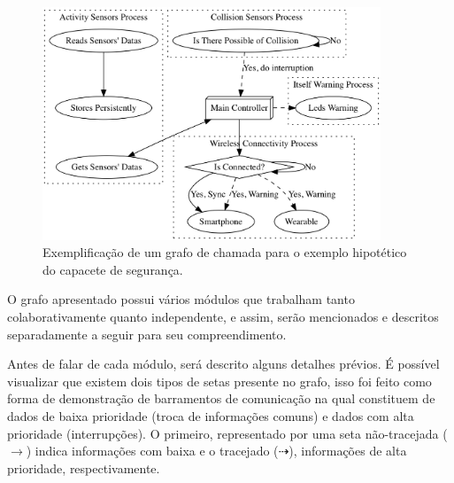          \begin{figure}[h] \centering
            \includegraphics[width=0.9\textwidth]{img/graph_wearable2.png}
            \caption{Exemplificação de um grafo de chamada para o exemplo hipotético do capacete de segurança.}
            \label{fig:graph_w2}
         \end{figure}
         
         O grafo apresentado possui vários módulos que trabalham tanto colaborativamente quanto independente, e assim, serão mencionados e descritos separadamente a seguir para seu compreendimento.
         
         Antes de falar de cada módulo, será descrito alguns detalhes prévios.
         É possível visualizar que existem dois tipos de setas presente no grafo, isso foi feito como forma de demonstração de barramentos de comunicação na qual constituem de dados de baixa prioridade (troca de informações comuns) e dados com alta prioridade (interrupções).
         O primeiro, representado por uma seta não-tracejada ($\longrightarrow$) indica informações com baixa e o tracejado ($\dashrightarrow$), informações de alta prioridade, respectivamente.
         

